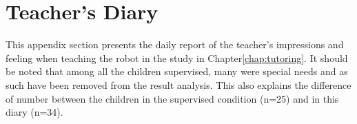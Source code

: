 \cleartooddpage
\chapter{Teacher's Diary} \label{app:diary}
This appendix section presents the daily report of the teacher's impressions and feeling when teaching the robot in the study in Chapter\ref{chap:tutoring}. It should be noted that among all the children supervised, many were special needs and as such have been removed from the result analysis. This also explains the difference of number between the children in the supervised condition (n=25) and in this diary (n=34).

